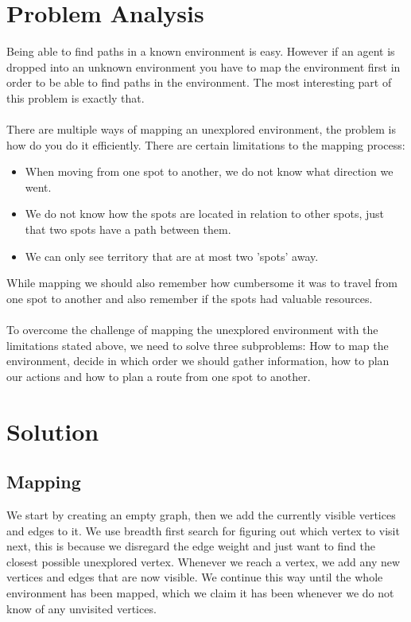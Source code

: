 \documentclass[11pt]{report}
\begin{document}
\section*{Problem Analysis}
Being able to find paths in a known environment is easy. However if an agent is dropped into an unknown environment you have to map the environment first in order to be able to find paths in the environment. The most interesting part of this problem is exactly that.\\
\\
There are multiple ways of mapping an unexplored environment, the problem is how do you do it efficiently. There are certain limitations to the mapping process:
\begin{itemize}
	\item When moving from one spot to another, we do not know what direction we went.
	\item We do not know how the spots are located in relation to other spots, just that two spots have a path between them.
	\item We can only see territory that are at most two 'spots' away.
\end{itemize}
While mapping we should also remember how cumbersome it was to travel from one spot to another and also remember if the spots had valuable resources.\\
\\
To overcome the challenge of mapping the unexplored environment with the limitations stated above, we need to solve three subproblems: How to map the environment, decide in which order we should gather information, how to plan our actions and how to plan a route from one spot to another.

\section*{Solution}
\subsection*{Mapping}
We start by creating an empty graph, then we add the currently visible vertices and edges to it. We use breadth first search for figuring out which vertex to visit next, this is because we disregard the edge weight and just want to find the closest possible unexplored vertex. Whenever we reach a vertex, we add any new vertices and edges that are now visible. We continue this way until the whole environment has been mapped, which we claim it has been whenever we do not know of any unvisited vertices.
\end{document}
